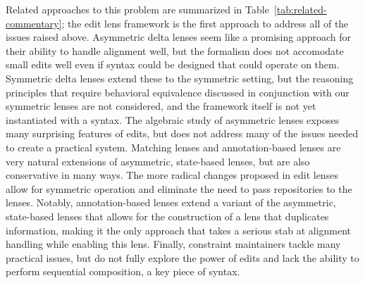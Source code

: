 Related approaches to this problem are summarized in
Table~\ref{tab:related-commentary}; the edit lens framework is the first
approach to address all of the issues raised above. Asymmetric delta lenses
seem like a promising approach for their ability to handle alignment well,
but the formalism does not accomodate small edits well even if syntax could
be designed that could operate on them. Symmetric delta lenses extend these
to the symmetric setting, but the reasoning principles that require
behavioral equivalence discussed in conjunction with our symmetric lenses
are not considered, and the framework itself is not yet instantiated with a
syntax. The algebraic study of asymmetric lenses exposes many surprising
features of edits, but does not address many of the issues needed to create
a practical system. Matching lenses and annotation-based lenses are very
natural extensions of asymmetric, state-based lenses, but are also
conservative in many ways. The more radical changes proposed in edit lenses
allow for symmetric operation and eliminate the need to pass repositories to
the lenses. Notably, annotation-based lenses extend a variant of the
asymmetric, state-based lenses that allows for the construction of a lens
that duplicates information, making it the only approach that takes a
serious stab at alignment handling while enabling this lens. Finally,
constraint maintainers tackle many practical issues, but do not fully
explore the power of edits and lack the ability to perform sequential
composition, a key piece of syntax.

